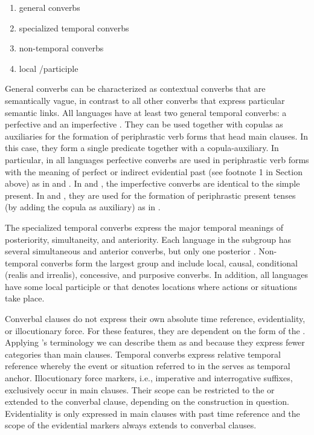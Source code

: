 \documentclass[output=paper]{LSP/langsci}
\begin{document}
\begin{enumerate}
\item general converbs 
\item specialized temporal converbs 
\item non-temporal converbs
\item local /participle
\end{enumerate}

General converbs can be characterized as contextual converbs that are semantically vague, in contrast to all other converbs that express particular semantic links. All  languages have at least two general temporal converbs: a perfective  and an imperfective . They can be used together with copulas as auxiliaries for the formation of periphrastic verb forms that head main clauses. In this case, they form a single predicate together with a copula-auxiliary. In particular, in all  languages perfective converbs are used in periphrastic verb forms with the meaning of perfect or indirect evidential past (see footnote 1 in Section  above) as in  and . In  and ,  the imperfective converbs are identical to the simple present. In  and , they are used for the formation of periphrastic present tenses (by adding the copula as  auxiliary) as in .

The specialized temporal converbs express the major temporal meanings of posteriority, simultaneity, and anteriority. Each language in the  subgroup has several simultaneous and anterior converbs, but only one posterior . Non-temporal converbs form the largest group and include local, causal, conditional (realis and irrealis), concessive, and purposive converbs. In addition, all  languages have some local participle or  that denotes locations where actions or situations take place.

Converbal clauses do not express their own absolute time reference, evidentiality, or illocutionary force. For these features, they are dependent on the form of the . Applying \citeauthor{Bickel.2010}'s \citeyear{Bickel.2010} terminology we can describe them as  and  because they express fewer categories than main clauses. Temporal converbs express relative temporal reference whereby the event or situation referred to in the  serves as temporal anchor. Illocutionary force markers, i.e., imperative and interrogative suffixes, exclusively occur in main clauses. Their scope can be restricted to the  or extended to the converbal clause, depending on the construction in question. Evidentiality is only expressed in main clauses with past time reference and the scope of the evidential markers always extends to converbal clauses.
\end{document}
